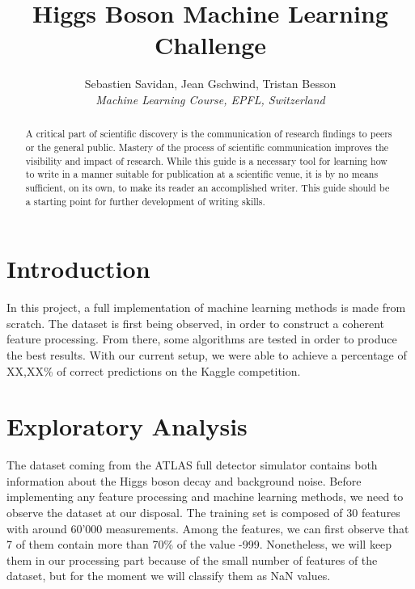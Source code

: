 \documentclass[10pt,conference,compsocconf]{IEEEtran}
\begin{document}
\title{Higgs Boson Machine Learning Challenge}

\author{
  Sebastien Savidan, Jean Gschwind, Tristan Besson\\
  \textit{Machine Learning Course, EPFL, Switzerland}
}

\maketitle

\begin{abstract}
  A critical part of scientific discovery is the
  communication of research findings to peers or the general public.
  Mastery of the process of scientific communication improves the
  visibility and impact of research. While this guide is a necessary
  tool for learning how to write in a manner suitable for publication
  at a scientific venue, it is by no means sufficient, on its own, to
  make its reader an accomplished writer. 
  This guide should be a starting point for further development of 
  writing skills.
\end{abstract}

\section{Introduction}

In this project, a full implementation of machine learning methods is made from scratch. The dataset is first being observed, in order to construct a coherent feature processing. From there, some algorithms are tested in order to produce the best results. With our current setup, we were able to achieve a percentage of XX,XX\% of correct predictions on the Kaggle competition.

\section{Exploratory Analysis}

The dataset coming from the ATLAS full detector simulator contains both information about the Higgs boson decay and background noise. Before implementing any feature processing and machine learning methods, we need to observe the dataset at our disposal. The training set is composed of 30 features with around 60'000 measurements. Among the features, we can first observe that 7 of them contain more than 70\% of the value -999. Nonetheless, we will keep them in our processing part because of the small number of features of the dataset, but for the moment we will classify them as NaN values.
\end{document}
